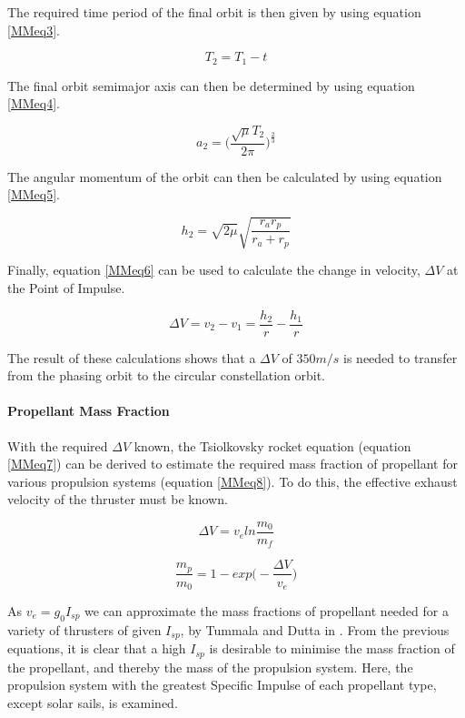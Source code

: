 The required time period of the final orbit is then given by using equation \ref{MMeq3}.

\begin{equation}
	T_2 = T_1 -t
	\label{MMeq3}
\end{equation}

The final orbit semimajor axis can then be determined by using equation \ref{MMeq4}.

\begin{equation}
	a_2 = \bigg(\frac{\sqrt{\mu}T_2}{2\pi}\bigg)^{\frac{2}{3}}
	\label{MMeq4}
\end{equation}

The angular momentum of the orbit can then be calculated by using equation \ref{MMeq5}.

\begin{equation}
	h_2 = \sqrt{2\mu}\sqrt{\frac{r_ar_p}{r_a+r_p}}
	\label{MMeq5}
\end{equation}

Finally, equation \ref{MMeq6} can be used to calculate the change in velocity, $\Delta V$ at the Point of Impulse.

\begin{equation}
	\Delta V = v_2 - v_1 = \frac{h_2}{r}-\frac{h_1}{r}
	\label{MMeq6}
\end{equation}

The result of these calculations shows that a $\Delta V$ of $350 m/s$ is needed to transfer from the phasing orbit to the circular constellation orbit.

\paragraph{Propellant Mass Fraction}
With the required $\Delta V$ known, the Tsiolkovsky rocket equation (equation \ref{MMeq7}) can be derived to estimate the required mass fraction of propellant for various propulsion systems (equation \ref{MMeq8}). To do this, the effective exhaust velocity of the thruster must be known.

\begin{equation}
	\Delta V = v_e ln \frac{m_0}{m_f}
	\label{MMeq7}
\end{equation}

\begin{equation}
	\frac{m_p}{m_0} = 1-exp\bigg(-\frac{\Delta V}{v_e}\bigg)
	\label{MMeq8}
\end{equation}

As $v_e = g_0 I_{sp}$ we can approximate the mass fractions of propellant needed for a variety of thrusters of given $I_{sp}$, by Tummala and Dutta in \cite{Tummala}. From the previous equations, it is clear that a high $I_{sp}$ is desirable to minimise the mass fraction of the propellant, and thereby the mass of the propulsion system. Here, the propulsion system with the greatest Specific Impulse of each propellant type, except solar sails, is examined.

